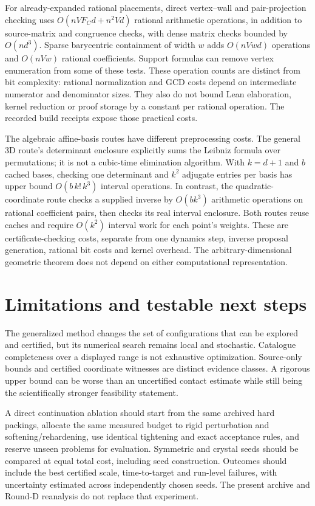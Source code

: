 \documentclass[11pt,a4paper]{article}
\begin{document}
For already-expanded rational placements, direct vertex--wall and pair-projection checking uses $O(nVF_Cd+n^2Vd)$ rational arithmetic operations, in addition to source-matrix and congruence checks, with dense matrix checks bounded by $O(nd^3)$. Sparse barycentric containment of width $w$ adds $O(nVwd)$ operations and $O(nVw)$ rational coefficients. Support formulas can remove vertex enumeration from some of these tests. These operation counts are distinct from bit complexity: rational normalization and GCD costs depend on intermediate numerator and denominator sizes. They also do not bound Lean elaboration, kernel reduction or proof storage by a constant per rational operation. The recorded build receipts expose those practical costs.

The algebraic affine-basis routes have different preprocessing costs. The general 3D route's determinant enclosure explicitly sums the Leibniz formula over permutations; it is not a cubic-time elimination algorithm. With $k=d+1$ and $b$ cached bases, checking one determinant and $k^2$ adjugate entries per basis has upper bound $O(b\,k!\,k^3)$ interval operations. In contrast, the quadratic-coordinate route checks a supplied inverse by $O(bk^3)$ arithmetic operations on rational coefficient pairs, then checks its real interval enclosure. Both routes reuse caches and require $O(k^2)$ interval work for each point's weights. These are certificate-checking costs, separate from one dynamics step, inverse proposal generation, rational bit costs and kernel overhead. The arbitrary-dimensional geometric theorem does not depend on either computational representation.

\section{Limitations and testable next steps}
The generalized method changes the set of configurations that can be explored and certified, but its numerical search remains local and stochastic. Catalogue completeness over a displayed range is not exhaustive optimization. Source-only bounds and certified coordinate witnesses are distinct evidence classes. A rigorous upper bound can be worse than an uncertified contact estimate while still being the scientifically stronger feasibility statement.

A direct continuation ablation should start from the same archived hard packings, allocate the same measured budget to rigid perturbation and softening/rehardening, use identical tightening and exact acceptance rules, and reserve unseen problems for evaluation. Symmetric and crystal seeds should be compared at equal total cost, including seed construction. Outcomes should include the best certified scale, time-to-target and run-level failures, with uncertainty estimated across independently chosen seeds. The present archive and Round-D reanalysis do not replace that experiment.
\end{document}
